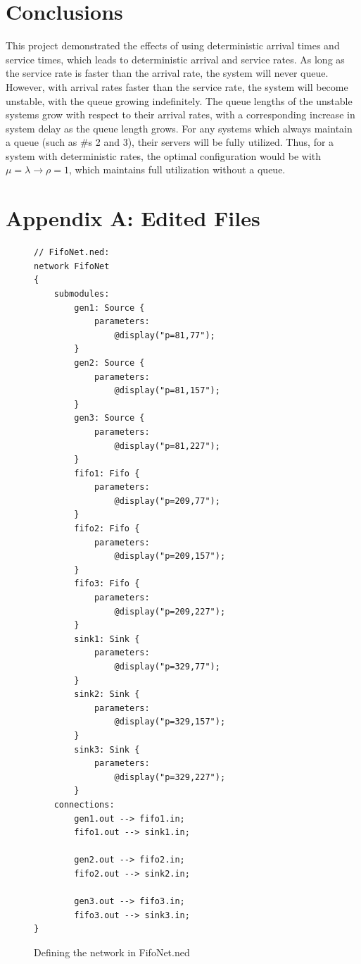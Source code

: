 \documentclass{article}
\begin{document}
\section*{Conclusions}
This project demonstrated the effects of using deterministic arrival times and service times, which leads to deterministic arrival and service rates.
As long as the service rate is faster than the arrival rate, the system will never queue.
However, with arrival rates faster than the service rate, the system will become unstable, with the queue growing indefinitely.
The queue lengths of the unstable systems grow with respect to their arrival rates, with a corresponding increase in system delay as the queue length grows.
For any systems which always maintain a queue (such as \#s 2 and 3), their servers will be fully utilized.
Thus, for a system with deterministic rates, the optimal configuration would be with $\mu = \lambda \rightarrow \rho = 1$, which maintains full utilization without a queue.
\newpage

\section*{Appendix A:  Edited Files}

\begin{figure}[H]
\label{FifoNet}
\begin{lstlisting}
// FifoNet.ned:
network FifoNet
{
    submodules:
        gen1: Source {
            parameters:
                @display("p=81,77");
        }
        gen2: Source {
            parameters:
                @display("p=81,157");
        }
        gen3: Source {
            parameters:
                @display("p=81,227");
        }
        fifo1: Fifo {
            parameters:
                @display("p=209,77");
        }
        fifo2: Fifo {
            parameters:
                @display("p=209,157");
        }
        fifo3: Fifo {
            parameters:
                @display("p=209,227");
        }
        sink1: Sink {
            parameters:
                @display("p=329,77");
        }
        sink2: Sink {
            parameters:
                @display("p=329,157");
        }
        sink3: Sink {
            parameters:
                @display("p=329,227");
        }
    connections:
        gen1.out --> fifo1.in;
        fifo1.out --> sink1.in;

        gen2.out --> fifo2.in;
        fifo2.out --> sink2.in;

        gen3.out --> fifo3.in;
        fifo3.out --> sink3.in;
}
\end{lstlisting}
\vspace{-1cm}
\caption*{Defining the network in FifoNet.ned}
\end{figure}
\end{document}
